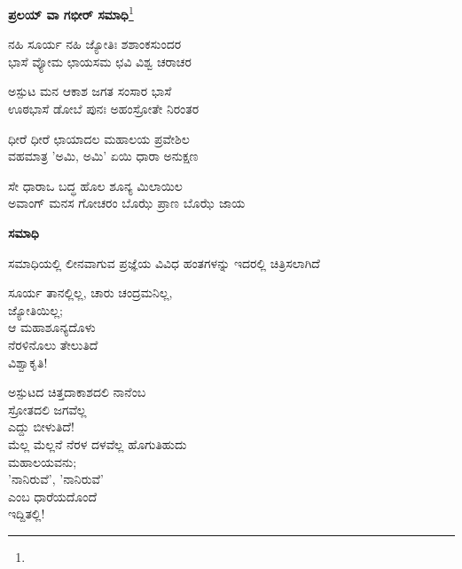\begin{center}
\textbf{ಪ್ರಲಯ್ ವಾ ಗಭೀರ್ ಸಮಾಧಿ}\footnote{}
\end{center}

\begin{myquote}
ನಹಿ ಸೂರ್ಯ ನಹಿ ಜ್ಯೋತಿಃ ಶಶಾಂಕಸುಂದರ\\ಭಾಸೆ ವ್ಯೋಮ ಛಾಯಸಮ ಛವಿ ವಿಶ್ವ ಚರಾಚರ
\end{myquote}


\begin{myquote}
ಅಸ್ಪುಟ ಮನ ಆಕಾಶ ಜಗತ ಸಂಸಾರ ಭಾಸೆ\\ಊಠಭಾಸೆ ಡೋಬೆ ಪುನಃ ಅಹಂಸ್ರೋತೇ ನಿರಂತರ
\end{myquote}


\begin{myquote}
ಧೀರೆ ಧೀರೆ ಛಾಯಾದಲ ಮಹಾಲಯ ಪ್ರವೇಶಿಲ\\ವಹಮಾತ್ರ 'ಅಮಿ, ಅಮಿ' ಏಯಿ ಧಾರಾ ಅನುಕ್ಷಣ
\end{myquote}


\begin{myquote}
ಸೇ ಧಾರಾಒ ಬದ್ಧ ಹೊಲ ಶೂನ್ಯ ಮಿಲಾಯಿಲ\\ಅವಾಂಗ್ ಮನಸ ಗೋಚರಂ ಬೊಝೆ ಪ್ರಾಣ ಬೊಝೆ ಜಾಯ
\end{myquote}


\begin{center}
\textbf{ಸಮಾಧಿ}
\end{center}

ಸಮಾಧಿಯಲ್ಲಿ ಲೀನವಾಗುವ ಪ್ರಜ್ಞೆಯ ವಿವಿಧ ಹಂತಗಳನ್ನು ಇದರಲ್ಲಿ ಚಿತ್ರಿಸಲಾಗಿದೆ

\begin{myquote}
ಸೂರ್ಯ ತಾನಲ್ಲಿಲ್ಲ, ಚಾರು ಚಂದ್ರಮನಿಲ್ಲ,\\ಜ್ಯೋತಿಯಿಲ್ಲ;\\ಆ ಮಹಾಶೂನ್ಯದೊಳು\\ನೆರಳಿನೊಲು ತೇಲುತಿದೆ\\ವಿಶ್ವಾಕೃತಿ!
\end{myquote}

\begin{myquote}
ಅಸ್ಪುಟದ ಚಿತ್ತದಾಕಾಶದಲಿ ನಾನೆಂಬ\\ಸ್ರೋತದಲಿ ಜಗವೆಲ್ಲ\\ಎದ್ದು ಬೀಳುತಿದೆ!\\ಮೆಲ್ಲ ಮೆಲ್ಲನೆ ನೆರಳ ದಳವೆಲ್ಲ ಹೊಗುತಿಹುದು\\ಮಹಾಲಯವನು;\\'ನಾನಿರುವೆ', 'ನಾನಿರುವೆ'\\ಎಂಬ ಧಾರೆಯದೊಂದೆ\\ಇದ್ದಿತಲ್ಲಿ!
\end{myquote}

